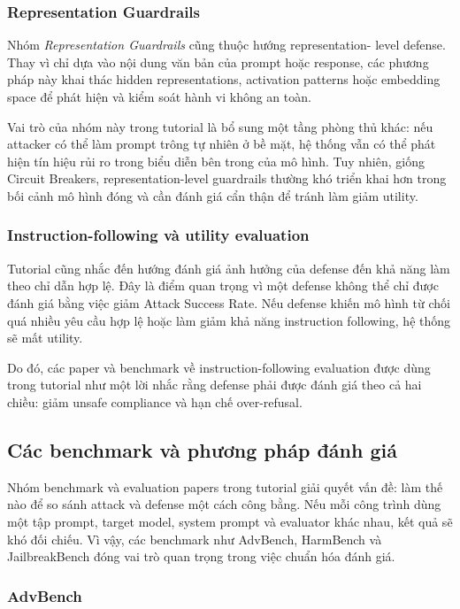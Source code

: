 \subsubsection{Representation Guardrails}

Nhóm \textit{Representation Guardrails} cũng thuộc hướng representation-
level defense. Thay vì chỉ dựa vào nội dung văn bản của prompt hoặc
response, các phương pháp này khai thác hidden representations, activation
patterns hoặc embedding space để phát hiện và kiểm soát hành vi không an
toàn.

Vai trò của nhóm này trong tutorial là bổ sung một tầng phòng thủ khác:
nếu attacker có thể làm prompt trông tự nhiên ở bề mặt, hệ thống vẫn có thể
phát hiện tín hiệu rủi ro trong biểu diễn bên trong của mô hình. Tuy nhiên,
giống Circuit Breakers, representation-level guardrails thường khó triển
khai hơn trong bối cảnh mô hình đóng và cần đánh giá cẩn thận để tránh làm
giảm utility.

\subsubsection{Instruction-following và utility evaluation}

Tutorial cũng nhắc đến hướng đánh giá ảnh hưởng của defense đến khả năng
làm theo chỉ dẫn hợp lệ. Đây là điểm quan trọng vì một defense không thể
chỉ được đánh giá bằng việc giảm Attack Success Rate. Nếu defense khiến mô
hình từ chối quá nhiều yêu cầu hợp lệ hoặc làm giảm khả năng instruction
following, hệ thống sẽ mất utility.

Do đó, các paper và benchmark về instruction-following evaluation được
dùng trong tutorial như một lời nhắc rằng defense phải được đánh giá theo
cả hai chiều: giảm unsafe compliance và hạn chế over-refusal.

\subsection{Các benchmark và phương pháp đánh giá}
\label{subsec:evaluation-papers}

Nhóm benchmark và evaluation papers trong tutorial giải quyết vấn đề: làm
thế nào để so sánh attack và defense một cách công bằng. Nếu mỗi công
trình dùng một tập prompt, target model, system prompt và evaluator khác
nhau, kết quả sẽ khó đối chiếu. Vì vậy, các benchmark như AdvBench,
HarmBench và JailbreakBench đóng vai trò quan trọng trong việc chuẩn hóa
đánh giá.

\subsubsection{AdvBench}

